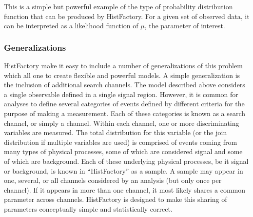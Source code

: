 
This is a simple but powerful example of the type of probability distribution function that can be produced by HistFactory.
For a given set of observed data, it can be interpreted as a likelihood function of $\mu$, the parameter of interest.



\subsubsection{Generalizations}

HistFactory make it easy to include a number of generalizations of this problem which all one to create flexible and powerful models.
A simple generalization is the inclusion of additional search channels.
The model described above considers a single observable defined in a single signal region.
However, it is common for analyses to define several categories of events defined by different criteria for the purpose of making a measurement.
Each of these categories is known as a search channel, or simply a channel.
Within each channel, one or more discriminating variables are measured.
The total distribution for this variable (or the join distribution if multiple variables are used) is comprised of events coming from many types of physical processes, 
some of which are considered signal and some of which are background.
Each of these underlying physical processes, be it signal or background, is known in ``HistFactory'' as a sample.
A sample may appear in one, several, or all channels considered by an analysis (but only once per channel).
If it appears in more than one channel, it most likely shares a common parameter across channels.
HistFactory is designed to make this sharing of parameters conceptually simple and statistically correct.

